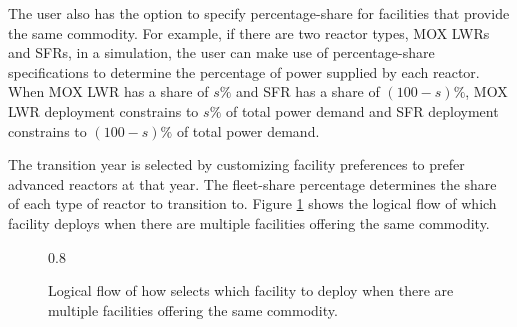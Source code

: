 The user also has the option to specify percentage-share for facilities 
that provide the same commodity. 
For example, if there are two reactor types, \gls{MOX} \glspl{LWR} and SFRs, in a simulation,
the user can make use of percentage-share specifications to determine the 
percentage of power supplied by each reactor.   
When MOX \gls{LWR} has a share of $s\%$ and 
\gls{SFR} has a share of $(100-s)\%$, 
MOX \gls{LWR} deployment constrains to $s\%$ of total power demand 
and SFR deployment constrains to $(100-s)\%$ of total power demand.  

The transition year is selected by customizing facility 
preferences to prefer advanced reactors at that year.
The fleet-share percentage determines the
share of each type of reactor to transition to. 
Figure \ref{fig:deployflow} shows the logical flow of
which facility \deploy deploys when there are multiple facilities 
offering the same commodity. 

\begin{figure}[]
	\centering
	 {0.8\height}{
    }
	
    \caption{Logical flow of how \deploy 
	selects which facility to deploy when there are multiple facilities 
	offering the same commodity.}
	\label{fig:deployflow}
\end{figure}

